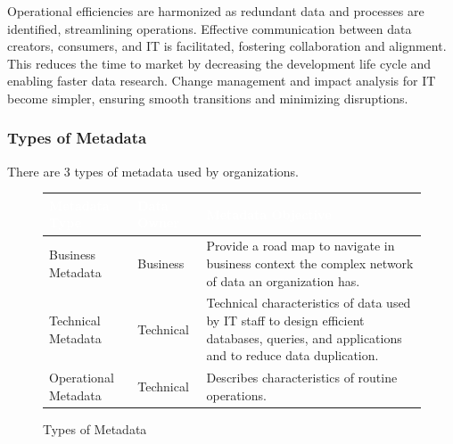 Operational efficiencies are harmonized as redundant data and processes are identified, streamlining operations. Effective communication between data creators, consumers, and IT is facilitated, fostering collaboration and alignment. This reduces the time to market by decreasing the development life cycle and enabling faster data research. Change management and impact analysis for IT become simpler, ensuring smooth transitions and minimizing disruptions. 

\subsubsection{Types of Metadata}
There are 3 types of metadata used by organizations.

\begin{figure}[H]
\begin{center}
    \renewcommand{\arraystretch}{1.5}
    \begin{tabular}{|>{\raggedright\arraybackslash}m{3.5cm}
                    |>{\raggedright\arraybackslash}m{3cm}
                    |>{\raggedright\arraybackslash}m{8cm}
                    |}
    \hline
    \rowcolor[HTML]{196fb4}\centering\textcolor{white}{\large Metadata Type} 
                            & \centering\textcolor{white}{\large Data Owner} 
                            & \centering\textcolor{white}{\large Metadata Objective} 
                            \tabularnewline 
    \hline
    Business Metadata & Business & Provide a road map to navigate in business context the complex network of data an organization has. \\\hline
    Technical Metadata & Technical & Technical characteristics of data used by IT staff to design efficient databases, queries, and applications and to reduce data duplication.\\\hline
    Operational Metadata & Technical & Describes characteristics of routine operations.\\\hline
    \end{tabular}
\end{center}
\caption{Types of Metadata}
\label{Types of Metadata}
\end{figure}

